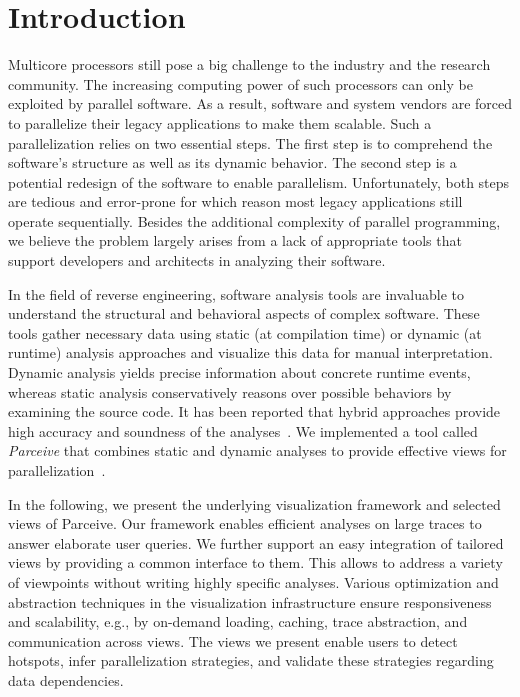\section{Introduction}
\label{sec:introduction}
Multicore processors still pose a big challenge to the industry and the
research community. The increasing computing power of such processors can only
be exploited by parallel software. As a result, software and system vendors
are forced to parallelize their legacy applications to make them scalable. Such
a parallelization relies on two essential steps. The first step is to
comprehend the software's structure as well as its dynamic behavior. The second
step is a potential redesign of the software to enable parallelism.
Unfortunately, both steps are tedious and error-prone for which reason most
legacy applications still operate sequentially. Besides the additional
complexity of parallel programming, we believe the problem largely arises from
a lack of appropriate tools that support developers and architects in analyzing
their software.

In the field of reverse engineering, software analysis tools are invaluable to
understand the structural and behavioral aspects of complex software. These
tools gather necessary data using static (at compilation time) or dynamic
(at runtime) analysis approaches and visualize this data for manual
interpretation. Dynamic analysis yields precise information about concrete
runtime events, whereas static analysis conservatively reasons over possible
behaviors by examining the source code. It has been reported that hybrid
approaches provide high accuracy and soundness of the
analyses~\cite{StaticDynamic}. We implemented a tool called \emph{Parceive}
that combines static and dynamic analyses to provide effective views for
parallelization~\cite{Parceive}.

In the following, we present the underlying visualization framework and
selected views of Parceive. Our framework enables efficient analyses on large
traces to answer elaborate user queries. We further support an easy integration
of tailored views by providing a common interface to them. This allows to
address a variety of viewpoints without writing highly specific analyses.
Various optimization and abstraction techniques in the visualization
infrastructure ensure responsiveness and scalability, e.g., by on-demand
loading, caching, trace abstraction, and communication across views. The views
we present enable users to detect hotspots, infer parallelization strategies,
and validate these strategies regarding data dependencies.